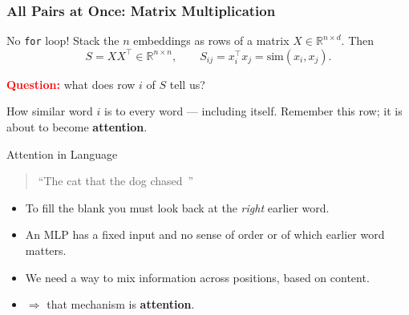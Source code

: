 \begin{frame}
    \frametitle{All Pairs at Once: Matrix Multiplication}

    No \texttt{for} loop! Stack the $n$ embeddings as \alert{rows} of a matrix $X \in \mathbb{R}^{n \times d}$. Then
    \[
        S = X X^\top \in \mathbb{R}^{n \times n},
        \qquad
        S_{ij} = x_i^\top x_j = \mathrm{sim}(x_i, x_j).
    \]

    \pause

    \begin{center}
    \end{center}

    \pause

    \textcolor{red}{\textbf{Question:}} what does row $i$ of $S$ tell us?

    \pause

    How similar word $i$ is to \alert{every} word --- including itself. Remember this row; it is about to become \textbf{attention}.
\end{frame}


\begin{frame}{Attention in Language}
  \begin{quote}
    ``The cat that the dog chased \underline{\hspace{1.2cm}}\,''
  \end{quote}
  \begin{itemize}
    \item To fill the blank you must look \alert{back} at the \emph{right} earlier word.
    \item An MLP has a fixed input and \alert{no sense of order} or of which earlier word matters.
    \item We need a way to \alert{mix information across positions, based on content}.
    \item[] \hfill $\Rightarrow$ that mechanism is \textbf{attention}.
  \end{itemize}
\end{frame}

